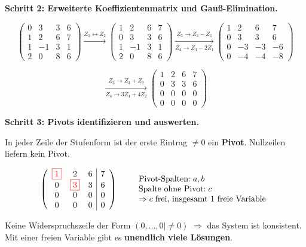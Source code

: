 \documentclass[a4paper,12pt]{article}
\newcommand{\piv}[1]{{\color{red}\boxed{#1}}}
\begin{document}
\textbf{Schritt 2: Erweiterte Koeffizientenmatrix und Gau\ss-Elimination.}

\[
\left(\begin{array}{ccc|c}
0 & 3 & 3 & 6 \\
1 & 2 & 6 & 7 \\
1 & -1 & 3 & 1 \\
2 & 0 & 8 & 6
\end{array}\right)
\xrightarrow{Z_1 \leftrightarrow Z_2}
\left(\begin{array}{ccc|c}
1 & 2 & 6 & 7 \\
0 & 3 & 3 & 6 \\
1 & -1 & 3 & 1 \\
2 & 0 & 8 & 6
\end{array}\right)
\xrightarrow[Z_4 \to Z_4 - 2Z_1]{Z_3 \to Z_3 - Z_1}
\left(\begin{array}{ccc|c}
1 & 2 & 6 & 7 \\
0 & 3 & 3 & 6 \\
0 & -3 & -3 & -6 \\
0 & -4 & -4 & -8
\end{array}\right)
\]

\[
\xrightarrow[Z_4 \to 3Z_4 + 4Z_2]{Z_3 \to Z_3 + Z_2}
\left(\begin{array}{ccc|c}
1 & 2 & 6 & 7 \\
0 & 3 & 3 & 6 \\
0 & 0 & 0 & 0 \\
0 & 0 & 0 & 0
\end{array}\right)
\]

\textbf{Schritt 3: Pivots identifizieren und auswerten.}

In jeder Zeile der Stufenform ist der erste Eintrag $\neq 0$ ein \textbf{Pivot}. Nullzeilen liefern kein Pivot.

\[
\left(\begin{array}{ccc|c}
\piv{1} & 2 & 6 & 7 \\
0 & \piv{3} & 3 & 6 \\
0 & 0 & 0 & 0 \\
0 & 0 & 0 & 0
\end{array}\right)
\qquad
\begin{array}{l}
\text{Pivot-Spalten:}\; a, b \\
\text{Spalte ohne Pivot:}\; c \\
\Rightarrow c \;\text{frei, insgesamt 1 freie Variable}
\end{array}
\]

Keine Widerspruchszeile der Form $(0,\dots,0 \mid \neq 0)$ $\Rightarrow$ das System ist konsistent.
Mit einer freien Variable gibt es \textbf{unendlich viele L\"osungen}.
\end{document}
